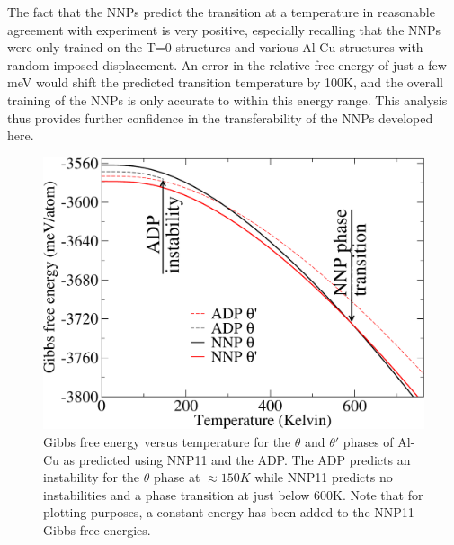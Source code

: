 \documentclass{article}
\begin{document}
The fact that the NNPs predict the transition at a temperature in reasonable agreement with experiment is very positive, especially recalling that the NNPs were only trained on the T=0 structures and various Al-Cu structures with random imposed displacement.  An error in the relative free energy of just a few meV would shift the predicted transition temperature by 100K, and the overall training of the NNPs is only accurate to within this energy range.  This analysis thus provides further confidence in the transferability of the NNPs developed here.

\begin{figure}[H]
    \includegraphics[width=1.0\columnwidth]{albert_figures/summary_phase_transition4-crop.pdf}
    \caption{Gibbs free energy versus temperature for the $\theta$ and $\theta'$ phases of Al-Cu as predicted using NNP11 and the ADP. The ADP predicts an instability for the $\theta$ phase at $\approx 150K$ while NNP11 predicts no instabilities and a phase transition at just below 600K. Note that for plotting purposes, a constant energy has been added to the NNP11 Gibbs free energies.} 
    \label{fig1}
\end{figure}


\end{document}
